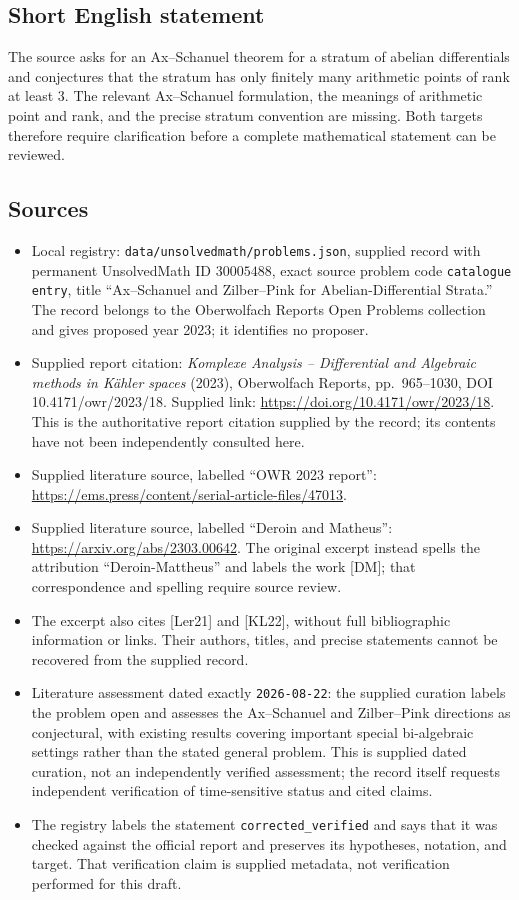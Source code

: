 \documentclass[11pt]{article}
\begin{document}
\subsection{Short English statement}
The source asks for an Ax--Schanuel theorem for a stratum of abelian differentials and conjectures that the stratum has only finitely many arithmetic points of rank at least \(3\). The relevant Ax--Schanuel formulation, the meanings of arithmetic point and rank, and the precise stratum convention are missing. Both targets therefore require clarification before a complete mathematical statement can be reviewed.
\subsection{Sources}
\begin{itemize}
\item Local registry: \texttt{data/unsolvedmath/problems.json}, supplied record with permanent UnsolvedMath ID \(30005488\), exact source problem code \texttt{catalogue entry}, title ``Ax--Schanuel and Zilber--Pink for Abelian-Differential Strata.'' The record belongs to the Oberwolfach Reports Open Problems collection and gives proposed year 2023; it identifies no proposer.
\item Supplied report citation: \emph{Komplexe Analysis -- Differential and Algebraic methods in K\"ahler spaces} (2023), Oberwolfach Reports, pp.~965--1030, DOI 10.4171/owr/2023/18. Supplied link: \url{https://doi.org/10.4171/owr/2023/18}. This is the authoritative report citation supplied by the record; its contents have not been independently consulted here.
\item Supplied literature source, labelled ``OWR 2023 report'': \url{https://ems.press/content/serial-article-files/47013}.
\item Supplied literature source, labelled ``Deroin and Matheus'': \url{https://arxiv.org/abs/2303.00642}. The original excerpt instead spells the attribution ``Deroin-Mattheus'' and labels the work [DM]; that correspondence and spelling require source review.
\item The excerpt also cites [Ler21] and [KL22], without full bibliographic information or links. Their authors, titles, and precise statements cannot be recovered from the supplied record.
\item Literature assessment dated exactly \texttt{2026-08-22}: the supplied curation labels the problem open and assesses the Ax--Schanuel and Zilber--Pink directions as conjectural, with existing results covering important special bi-algebraic settings rather than the stated general problem. This is supplied dated curation, not an independently verified assessment; the record itself requests independent verification of time-sensitive status and cited claims.
\item The registry labels the statement \texttt{corrected\_verified} and says that it was checked against the official report and preserves its hypotheses, notation, and target. That verification claim is supplied metadata, not verification performed for this draft.
\end{itemize}
\end{document}
